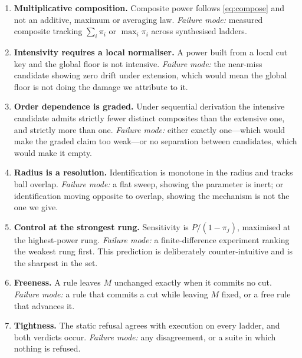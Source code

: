 \documentclass[11pt,twocolumn,a4paper]{article}
\theoremstyle{plain}
\theoremstyle{definition}
\theoremstyle{remark}
\newcommand{\pow}{\pi}
\begin{document}
\begin{enumerate}[label=\textbf{P\arabic*.},leftmargin=3em,itemsep=0.6em]

\item \textbf{Multiplicative composition.} Composite power follows
\cref{eq:compose} and not an additive, maximum or averaging law.
\emph{Failure mode:} measured composite tracking $\sum_i\pow_i$ or
$\max_i\pow_i$ across synthesised ladders.

\item \textbf{Intensivity requires a local normaliser.} A power built from a
local cut key and the global floor is not intensive.
\emph{Failure mode:} the near-miss candidate showing zero drift under
extension, which would mean the global floor is not doing the damage we
attribute to it.

\item \textbf{Order dependence is graded.} Under sequential derivation the
intensive candidate admits strictly fewer distinct composites than the
extensive one, and strictly more than one.
\emph{Failure mode:} either exactly one---which would make the graded claim
too weak---or no separation between candidates, which would make it empty.

\item \textbf{Radius is a resolution.} Identification is monotone in the
radius and tracks ball overlap.
\emph{Failure mode:} a flat sweep, showing the parameter is inert; or
identification moving opposite to overlap, showing the mechanism is not the one
we give.

\item \textbf{Control at the strongest rung.} Sensitivity is
$P/(1-\pow_j)$, maximised at the highest-power rung.
\emph{Failure mode:} a finite-difference experiment ranking the weakest rung
first. This prediction is deliberately counter-intuitive and is the sharpest
in the set.

\item \textbf{Freeness.} A rule leaves $M$ unchanged exactly when it commits
no cut.
\emph{Failure mode:} a rule that commits a cut while leaving $M$ fixed, or a
free rule that advances it.

\item \textbf{Tightness.} The static refusal agrees with execution on every
ladder, and both verdicts occur.
\emph{Failure mode:} any disagreement, or a suite in which nothing is refused.

\end{enumerate}
\end{document}
